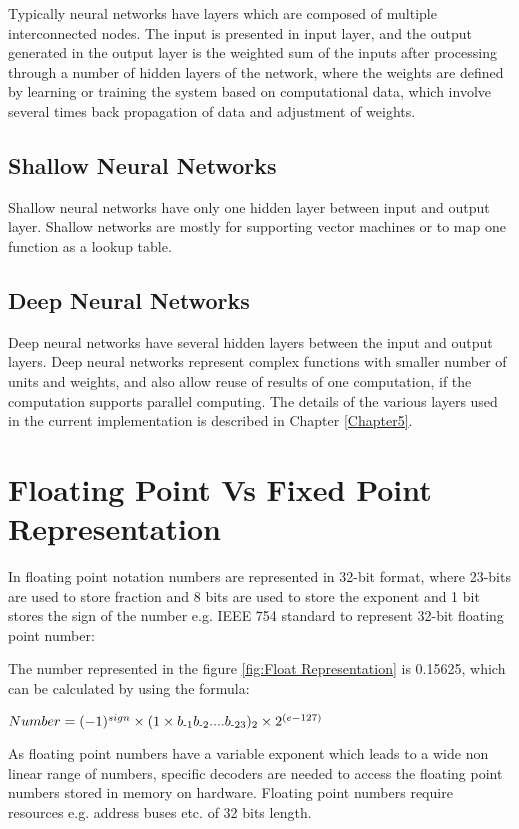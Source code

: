  \noindent Typically neural networks have layers which are composed of multiple interconnected nodes. The input is presented in input layer, and the output generated in the output layer is the weighted sum of the inputs after processing through a number of hidden layers of the network, where the weights are defined by learning or training the system based on computational data, which involve several times back propagation of data and adjustment of weights.
\subsection{Shallow Neural Networks} 
Shallow neural networks have only one hidden layer between input and output layer. Shallow networks are mostly for supporting vector machines or to map one function as a lookup table.
\subsection{Deep Neural Networks} Deep neural networks have several hidden layers between the input and output layers. Deep neural networks represent complex functions with smaller number of units and weights, and also allow reuse of results of one computation, if the computation supports parallel computing. The details of the various layers used in the current implementation is described in Chapter \ref{Chapter5}.

\section{Floating Point Vs Fixed Point Representation}
 In floating point notation numbers are represented in 32-bit format, where 23-bits are used to store fraction and 8 bits are used to store the exponent and 1 bit stores the sign of the number e.g. IEEE 754 standard to represent 32-bit floating point number:



The number represented in the figure \ref{fig:Float Representation} is 0.15625, which can be calculated by using the formula:

\vspace{0.25cm}
\hspace{3cm}
$Number= (-1)^{sign}\times (1\times b\textsubscript{-1}b\textsubscript{-2}....b\textsubscript{-23})\textsubscript{2}\times 2^{(e-127)}$  

\vspace{0.25cm}
\noindent As floating point numbers have a variable exponent which leads to a wide non linear range of numbers, specific decoders are needed to access the floating point numbers stored in memory on hardware. Floating point numbers require resources e.g. address buses etc. of 32 bits length.

